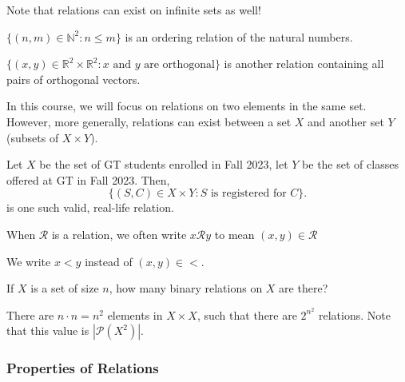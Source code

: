 Note that relations can exist on infinite sets as well!

\begin{eg}
	\( \{(n,m) \in \mathbb{N}^2 \colon n \le m\}   \) is an ordering relation of the natural numbers.
\end{eg}

\begin{eg}
	\( \{(x,y) \in \mathbb{R}^2 \times \mathbb{R}^2 \colon x \text{ and } y \text{ are orthogonal}\} \) is another relation containing all pairs of orthogonal vectors.
\end{eg}

\begin{remark}
	In this course, we will focus on relations on two elements in the same set. However, more generally, relations can exist between a set \( X \) and another set \( Y \) (subsets of \( X \times  Y \)).
\end{remark}

\begin{eg}
	Let \( X \) be the set of GT students enrolled in Fall 2023, let \( Y \) be the set of classes offered at GT in Fall 2023. Then, \[
		\{(S,C) \in X \times Y \colon S \text{ is registered for } C\}
	.\] is one such valid, real-life relation.
\end{eg}

\begin{notation}
	When \( \mathcal{R} \) is a relation, we often write \( x \mathcal{R}y \) to mean \( (x,y) \in \mathcal{R} \)
\end{notation}

\begin{eg}
	We write \( x < y \) instead of \( (x,y) \in < \).
\end{eg}

\begin{eg}
	If \( X \) is a set of size \( n \), how many binary relations on \( X \) are there?
\end{eg}

There are \( n \cdot n = n^2\) elements in \( X \times X \), such that there are \( 2^{n^2} \) relations. Note that this value is \( |\mathcal{P}(X^2)| \).

\subsubsection{Properties of Relations}


